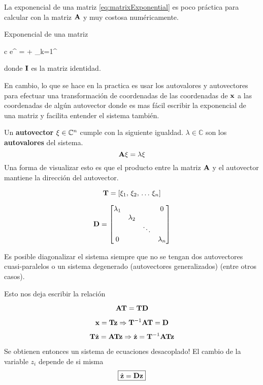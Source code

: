 La exponencial de una matriz \eqref{eq:matrixExponential} es poco práctica para calcular con la matriz \(\mathbf{A}\) y muy costosa numéricamente.

\begin{definition}{Exponencial de una matriz}
	\begin{IEEEeqnarray}{c}\label{eq:matrixExponential}
	e^{\MX} = \eye + \sum_{k=1}^{\infty} 
	\end{IEEEeqnarray}
donde $\mathbf{I}$ es la matriz identidad.
\end{definition}

En cambio, lo que se hace en la practica es usar los autovalores y autovectores para efectuar una transformación de coordenadas de las coordenadas de $\mathbf{x}$ a las coordenadas de algún autovector donde es mas fácil escribir la exponencial de una matriz y facilita entender el sistema también.

Un \textbf{autovector} $\mathbf{\xi}\in\mathbb{C}^{n}$ cumple con la siguiente igualdad. $\lambda \in \mathbb{C}$ son los \textbf{autovalores} del sistema.
\[
\mathbf{A}\mathbf{\xi} = \lambda \mathbf{\xi}
\]
Una forma de visualizar esto es que el producto entre la matriz $\mathbf{A}$ y el autovector mantiene la dirección del autovector.

\[
\mathbf{T} = \left[ \xi_1,\, \xi_2,\, \ldots\, \xi_{n} \right]
\]

\[
\mathbf{D}= \begin{bmatrix}
\lambda_1 & & & 0 \\
 & \lambda_2 & & \\
  & & \ddots & \\
 0 & & & \lambda_{n} 
\end{bmatrix}
\]

Es posible diagonalizar el sistema siempre que no se tengan dos autovectores cuasi-paralelos o un sistema degenerado (autovectores generalizados) (entre otros casos). 

Esto nos deja escribir la relación

\[
\mathbf{A} \mathbf{T} = \mathbf{T} \mathbf{D}
\]

\[
\mathbf{x} = \mathbf{T}\mathbf{z} \Rightarrow \mathbf{T}^{-1} \mathbf{A} \mathbf{T} = \mathbf{D}
\]

\[
\mathbf{T} \dot{\mathbf{z}} = \mathbf{A} \mathbf{T} \mathbf{z} \Rightarrow \dot{\mathbf{z}} = \mathbf{T}^{-1} \mathbf{A} \mathbf{T} \mathbf{z}
\]

Se obtienen entonces un sistema de ecuaciones desacoplado! El cambio de la variable $z_i$ depende de si misma
\[
\boxed{\dot{\mathbf{z}} = \mathbf{D} \mathbf{z}}
\]

